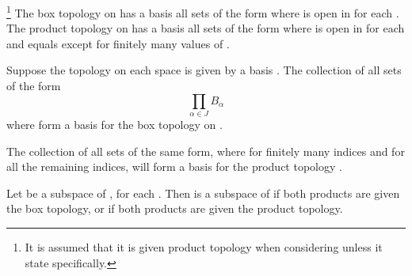 \begin{theorem}\label{theorem:ComparisonOfBoxProductTopology}\footnote{
      It is assumed that it is given product topology when considering  unless it state specifically.
}
      The box topology on  has a basis all sets of the form  where  is open in  for each \mt{\alpha}. The product topology on  has a basis all sets of the form  where  is open in  for each \mt{\alpha} and  equals  except for finitely many values of \mt{\alpha}.
\end{theorem}

\begin{theorem}\omitObviuos
      Suppose the topology on each space  is given by a basis . The collection of all sets of the form
      \begin{equation*}
            \prod_{\alpha \in J} B_{\alpha}
      \end{equation*}
      where  form a basis for the box topology on .

      The collection of all sets of the same form, where  for finitely many indices \mt{\alpha} and  for all the remaining indices, will form a basis for the product topology .
\end{theorem}

\begin{theorem}\omitObviuos
      Let  be a subspace of , for each . Then  is a subspace of  if both products are given the box topology, or if both products are given the product topology.
\end{theorem}


